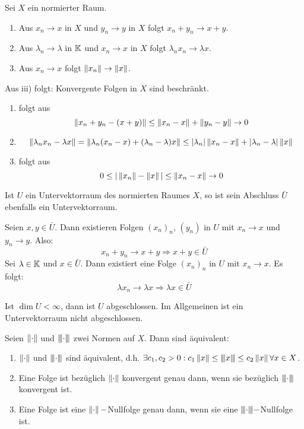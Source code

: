 \newpage
\begin{satz}
Sei $ X $ ein normierter Raum.
\begin{enumerate}
\item Aus $ x_n\rightarrow x $ in $ X $ und $ y_n\rightarrow y $ in $ X $ folgt $ x_n+y_n\rightarrow x+y $.
\item Aus $ \lambda_n\rightarrow\lambda $ in $ \mathbb{K} $ und $ x_n\rightarrow x $ in $ X $ folgt $ \lambda_nx_n\rightarrow \lambda x $.
\item Aus $ x_n\rightarrow x $ folgt $ \left\|x_n\right\|\rightarrow \left\|x\right\| $.
\end{enumerate}
\end{satz}
\begin{bemerkung*}
Aus iii) folgt: Konvergente Folgen in $ X $ sind beschr\"ankt.
\end{bemerkung*}
\begin{beweis}
\begin{enumerate}
\item folgt aus \[ \left\|x_n+y_n-(x+y)\right\|\leq\left\|x_n-x\right\|+\left\|y_n-y\right\|\rightarrow 0 \]
\item 
\[ \left\|\lambda_nx_n-\lambda x\right\|=\left\|\lambda_n(x_n-x)+(\lambda_n-\lambda)x\right\|\leq|\lambda_n|\left\|x_n-x\right\|+|\lambda_n-\lambda|\left\|x\right\| \]
\item folgt aus
\[ 0\leq|\left\|x_n\right\|-\left\|x\right\||\leq\left\|x_n-x\right\|\rightarrow 0 \]
\end{enumerate}
\end{beweis}
\begin{satz}
Ist $ U $ ein Untervektorraum des normierten Raumes $ X $, so ist sein Abschluss $ \bar U $ ebenfalls ein Untervektorraum.
\end{satz}
\begin{beweis}
Seien $ x,y\in\bar U $. Dann existieren Folgen $ (x_n)_n $, $ (y_n) $ in $ U $ mit $ x_n\rightarrow x $ und $ y_n\rightarrow y $. Also:
\[ x_n+y_n\rightarrow x+y\Rightarrow x+y\in\bar U \]
Sei $ \lambda\in\mathbb{K} $ und $ x\in \bar U$. Dann existiert eine Folge $ (x_n)_n $ in $ U $ mit $ x_n\rightarrow x $. Es folgt:
\[ \lambda x_n\rightarrow \lambda x\Rightarrow \lambda x\in\bar U \]
\end{beweis}
\newpage
\begin{bemerkung*}
Ist $ \dim U<\infty $, dann ist $ U $ abgeschlossen. Im Allgemeinen ist ein Untervektorraum nicht abgeschlossen.
\end{bemerkung*}
\begin{satz}
Seien $ \left\|\cdot\right\| $ und $ {\left\vert\kern-0.25ex\left\vert\kern-0.25ex\left\vert \cdot \right\vert\kern-0.25ex\right\vert\kern-0.25ex\right\vert} $ zwei Normen auf $ X $. Dann sind \"aquivalent:
\begin{enumerate}
\item $ \left\|\cdot\right\| $ und $ {\left\vert\kern-0.25ex\left\vert\kern-0.25ex\left\vert \cdot \right\vert\kern-0.25ex\right\vert\kern-0.25ex\right\vert} $ sind \"aquivalent, d.h. $ \exists c_1,c_2>0:c_1\left\|x\right\|\leq{\left\vert\kern-0.25ex\left\vert\kern-0.25ex\left\vert x \right\vert\kern-0.25ex\right\vert\kern-0.25ex\right\vert}\leq c_2\left\|x\right\|\forall x\in X $.
\item Eine Folge ist bez\"uglich $ \left\|\cdot\right\| $ konvergent genau dann, wenn sie bez\"uglich $ {\left\vert\kern-0.25ex\left\vert\kern-0.25ex\left\vert \cdot \right\vert\kern-0.25ex\right\vert\kern-0.25ex\right\vert} $ konvergent ist.
\item Eine Folge ist eine $ \left\|\cdot\right\|- $Nullfolge genau dann, wenn sie eine $ {\left\vert\kern-0.25ex\left\vert\kern-0.25ex\left\vert \cdot \right\vert\kern-0.25ex\right\vert\kern-0.25ex\right\vert}- $Nullfolge ist.
\end{enumerate}
\end{satz}
